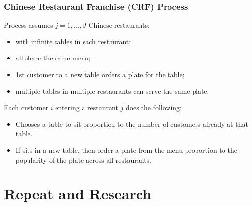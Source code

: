 \documentclass{beamer}
\begin{document}
\begin{frame}
    \frametitle{Chinese Restaurant Franchise (CRF) Process}
    Process assumes $j = 1,...,J$ Chinese restaurants:
    \begin{itemize}
        \item with infinite tables in each restaurant;
        \item all share the same menu;
        \item 1st customer to a new table orders a plate for the table;
        \item multiple tables in multiple restaurants can serve the same plate.
    \end{itemize}
    Each customer $i$ entering a restaurant $j$ does the following:
    \begin{itemize}
        \item Chooses a table to sit proportion to the number of customers already at that table.
        \item If sits in a new table, then order a plate from the menu proportion to the popularity of the plate across all restaurants.
    \end{itemize}
\end{frame}



\section{Repeat and Research}
\end{document}
